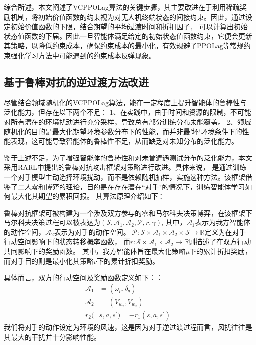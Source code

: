 综合所述，本文阐述了VCPPOLag算法的关键步骤，其主要改进在于利用稀疏奖励机制，将初始价值函数的约束视为对无人机终端状态的间接约束。因此，通过设定初始价值函数的下限，结合期望的平均过渡时间和折扣因子，
可以计算出初始状态值函数的下届。因此一旦智能体满足给定的初始状态值函数约束，它便会更新其策略，以降低约束成本，确保约束成本的最小化，有效规避了PPOLag等常规约束强化学习方法中可能遇到的约束成本反弹现象。

\subsection{基于鲁棒对抗的逆过渡方法改进}
尽管结合领域随机化的VCPPOLag算法，能在一定程度上提升智能体的鲁棒性与泛化能力，但存在以下两个不足：
1、在实践中，由于时间和资源的限制，不可能对所有潜在的环境扰动进行充分采样，导致总有部分训练分布未能覆盖。
2、领域随机化的目的是最大化期望环境参数分布下的性能，而并非最’坏‘环境条件下的性能表现，这可能导致智能体的鲁棒性不足，从而缺乏对未知分布的泛化能力。

鉴于上述不足，为了增强智能体的鲁棒性和对未曾遭遇测试分布的泛化能力，本文采用RARL\cite{pinto2017robust}中提出的鲁棒对抗攻击框架对策略进行改进。具体来说，
是通过训练一个对手模型主动选择环境扰动，而不是依赖随机抽样，实施这种方法。该框架借鉴了二人零和博弈的理论，目的是在存在潜在“对手”的情况下，训练智能体学习如何最大化其期望的累积回报。
其算法原理介绍如下：

鲁棒对抗框架可被构建为一个涉及双方参与的零和马尔科夫决策博弈，在该框架下马尔科夫决策过程可以被表达为$\left(\mathcal{S}, \mathcal{A}_{1}, \mathcal{A}_{2}, \mathcal{P}, r, \gamma\right)$,
其中，$\mathcal{A}_{1}$表示为我方智能体的动作空间，$\mathcal{A}_{2}$表示为对手的动作空间。
$\mathcal{P}: \mathcal{S} \times \mathcal{A}_{1} \times \mathcal{A}_{2} \times \mathcal{S} \rightarrow \mathbb{R}$定义为在对手行动空间影响下的状态转移概率函数，
而$r: \mathcal{S} \times \mathcal{A}_{1} \times \mathcal{A}_{2} \rightarrow \mathbb{R}$则描述了在双方行动共同影响下的奖励函数。
其中，我方智能体旨在最大化策略$\mu$下的累计折扣奖励，而对手目的则是最小化其策略$\nu$下的累计折扣奖励。

具体而言，双方的行动空间及奖励函数定义如下：：
\begin{align}
    \mathcal{A}_{1} & = \left ( \omega_{p},\delta_{y} \right ) \\
    \mathcal{A}_{2} & = \left (V_{w_{x}}, V_{w_{z}}\right )\\
    r_{2}(&s,a,s^{\prime})=-r_{1}(s,a,s^{\prime})
\end{align}
我们将对手的动作设定为环境的风速，这是因为对于逆过渡过程而言，风扰往往是其最大的干扰并十分影响性能。

